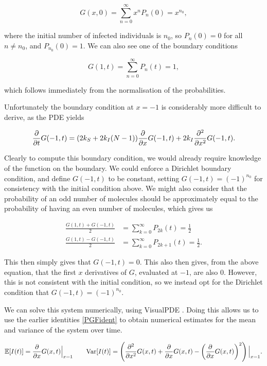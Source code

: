 \documentclass[12pt,a4paper,openany,twoside]{book}
\def \p {\partial}
\newcommand{\pd}[2]{\mathchoice{\frac{\p #1}{\p #2}}{\p #1/\p #2}{\p #1/\p #2}{\p #1/\p #2}}
\newcommand{\pdd}[2]{\mathchoice{\frac{\p^2 #1}{\p #2^2}}{\p^2 #1/\p #2^2}{\p^2 #1/\p #2^2}{\p^2 #1/\p #2^2}}
\begin{document}
\begin{equation}
	G(x, 0) = \sum_{n = 0}^\infty x^n P_n(0) = x^{n_0},
\end{equation}

where the initial number of infected individuals is $n_0$, so $P_n(0) = 0$ for all $n \neq n_0$, and $P_{n_0}(0) = 1$. We can also see one of the boundary conditions

\begin{equation}
	G(1, t) = \sum_{n = 0}^\infty P_n(t) = 1,
\end{equation}

which follows immediately from the normalisation of the probabilities.

Unfortunately the boundary condition at $x = -1$ is considerably more difficult to derive, as the PDE yields

\begin{equation}
	\pd {} {t} G(-1, t) = (2 k_S + 2 k_I (N-1)) \pd {} {x} G(-1, t) + 2 k_I \pdd {} {x} G(-1, t).
\end{equation}

Clearly to compute this boundary condition, we would already require knowledge of the function on the boundary. We could enforce a Dirichlet boundary condition, and define $G(-1, t)$ to be constant, setting $G(-1, t) = (-1)^{n_0}$ for consistency with the initial condition above. We might also consider that the probability of an odd number of molecules should be approximately equal to the probability of having an even number of molecules, which gives us

\begin{align}
	\frac {G(1, t) + G(-1, t)} {2} &= \sum_{k = 0}^\infty P_{2k}(t) = \frac 1 2\\
	\frac {G(1, t) - G(-1, t)} {2} &= \sum_{k = 0}^\infty P_{2k+1}(t) = \frac 1 2.
\end{align}

This then simply gives that $G(-1, t) = 0$. This also then gives, from the above equation, that the first $x$ derivatives of $G$, evaluated at $-1$, are also $0$. However, this is not consistent with the initial condition, so we instead opt for the Dirichlet condition that $G(-1, t) = (-1)^{n_0}$.

We can solve this system numerically, using VisualPDE \citep{walkerVisualPDERapidInteractive2023}. Doing this allows us to use the earlier identities \ref{PGFident} to obtain numerical estimates for the mean and variance of the system over time.

\begin{equation}
	\mathbb{E} [I(t)] = \pd {} {x} G(x, t) \Big|_{x = 1} \qquad
	\mathrm{Var} [I(t)] = \left( \pdd {} {x} G(x, t) + \pd {} {x} G(x, t) - \left( \pd {} {x} G(x, t) \right)^2 \right) \Big|_{x = 1}.
\end{equation}
\end{document}
